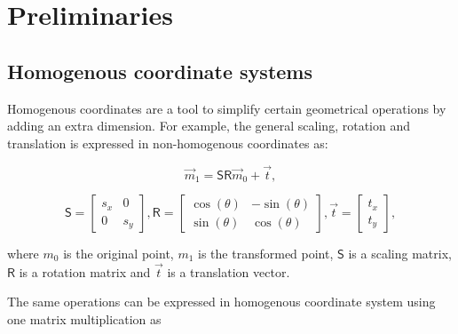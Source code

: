 \chapter{Preliminaries}

\label{chapter:preliminaries}
\section{Homogenous coordinate systems}

Homogenous coordinates are a tool to simplify certain geometrical operations by adding an extra dimension.
For example, the general scaling, rotation and translation is expressed in non-homogenous coordinates as:

\begin{equation}
    \vec{m}_1 = 
    \pmb{\mathsf{S}} \pmb{\mathsf{R}}
    \vec{m}_0
    + \vec{t},
\end{equation}

\begin{equation}
    \pmb{\mathsf{S}} = \begin{bmatrix} s_x & 0 \\ 0 & s_y \end{bmatrix}, \pmb{\mathsf{R}} = \begin{bmatrix} \cos(\theta) & -\sin(\theta) \\ \sin(\theta) & \cos(\theta) \end{bmatrix}, \vec{t} = \begin{bmatrix} t_x \\ t_y \end{bmatrix},
\end{equation}

where $m_0$ is the original point,
$m_1$ is the transformed point,
$\pmb{\mathsf{S}}$ is a scaling matrix,
$\pmb{\mathsf{R}}$ is a rotation matrix and 
$\vec{t}$ is a translation vector.

The same operations can be expressed in homogenous coordinate system using one matrix multiplication as

